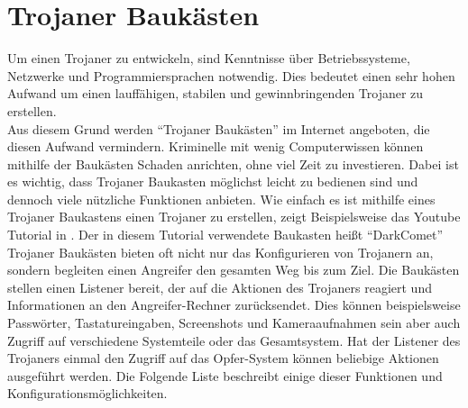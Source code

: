 \section{Trojaner Baukästen}\label{sec:trojanerBaukaesten}
Um einen Trojaner zu entwickeln, sind Kenntnisse über Betriebssysteme, Netzwerke und Programmiersprachen notwendig.
Dies bedeutet einen sehr hohen Aufwand um einen lauffähigen, stabilen und gewinnbringenden Trojaner zu erstellen.\\
Aus diesem Grund werden \enquote{Trojaner Baukästen} im Internet angeboten, die diesen Aufwand vermindern. 
Kriminelle mit wenig Computerwissen können mithilfe der Baukästen Schaden anrichten, ohne viel Zeit zu investieren.
Dabei ist es wichtig, dass Trojaner Baukasten möglichst leicht zu bedienen sind und dennoch viele nützliche Funktionen anbieten. 
Wie einfach es ist mithilfe eines Trojaner Baukastens einen Trojaner zu erstellen, zeigt Beispielsweise das Youtube Tutorial in \cite{YOUTUBE}.
Der in diesem Tutorial verwendete Baukasten heißt \enquote{DarkComet}\\
Trojaner Baukästen bieten oft nicht nur das Konfigurieren von Trojanern an, sondern
begleiten einen Angreifer den gesamten Weg bis zum Ziel. 
Die Baukästen stellen einen Listener bereit, der auf die Aktionen des Trojaners reagiert und Informationen an den
Angreifer-Rechner zurücksendet. Dies können beispielsweise Passwörter, Tastatureingaben, Screenshots und Kameraaufnahmen sein aber auch Zugriff auf verschiedene
Systemteile oder das Gesamtsystem. Hat der Listener des Trojaners einmal den Zugriff auf das Opfer-System können beliebige Aktionen ausgeführt werden.
Die Folgende Liste beschreibt einige dieser Funktionen und Konfigurationsmöglichkeiten.\cite{PANDA}
